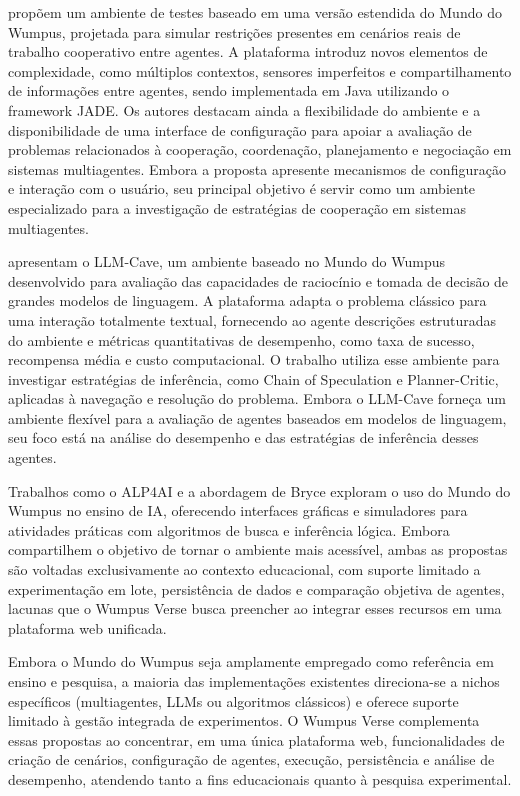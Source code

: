 \cite{salehi2012multicontext} propõem um ambiente de testes baseado em uma versão estendida do Mundo do Wumpus, projetada para simular restrições presentes em cenários reais de trabalho cooperativo entre agentes. A plataforma introduz novos elementos de complexidade, como múltiplos contextos, sensores imperfeitos e compartilhamento de informações entre agentes, sendo implementada em Java utilizando o framework JADE. Os autores destacam ainda a flexibilidade do ambiente e a disponibilidade de uma interface de configuração para apoiar a avaliação de problemas relacionados à cooperação, coordenação, planejamento e negociação em sistemas multiagentes. Embora a proposta apresente mecanismos de configuração e interação com o usuário, seu principal objetivo é servir como um ambiente especializado para a investigação de estratégias de cooperação em sistemas multiagentes.

\cite{li2025llmcave} apresentam o LLM-Cave, um ambiente baseado no Mundo do Wumpus desenvolvido para avaliação das capacidades de raciocínio e tomada de decisão de grandes modelos de linguagem. A plataforma adapta o problema clássico para uma interação totalmente textual, fornecendo ao agente descrições estruturadas do ambiente e métricas quantitativas de desempenho, como taxa de sucesso, recompensa média e custo computacional. O trabalho utiliza esse ambiente para investigar estratégias de inferência, como Chain of Speculation e Planner-Critic, aplicadas à navegação e resolução do problema. Embora o LLM-Cave forneça um ambiente flexível para a avaliação de agentes baseados em modelos de linguagem, seu foco está na análise do desempenho e das estratégias de inferência desses agentes.

Trabalhos como o ALP4AI \cite{lasisi2022alp4ai} e a abordagem de Bryce \cite{bryce2011wumpus} exploram o uso do Mundo do Wumpus no ensino de IA, oferecendo interfaces gráficas e simuladores para atividades práticas com algoritmos de busca e inferência lógica. Embora compartilhem o objetivo de tornar o ambiente mais acessível, ambas as propostas são voltadas exclusivamente ao contexto educacional, com suporte limitado a experimentação em lote, persistência de dados e comparação objetiva de agentes, lacunas que o Wumpus Verse busca preencher ao integrar esses recursos em uma plataforma web unificada.

Embora o Mundo do Wumpus seja amplamente empregado como referência em ensino e pesquisa, a maioria das implementações existentes direciona-se a nichos específicos (multiagentes, LLMs ou algoritmos clássicos) e oferece suporte limitado à gestão integrada de experimentos. O Wumpus Verse complementa essas propostas ao concentrar, em uma única plataforma web, funcionalidades de criação de cenários, configuração de agentes, execução, persistência e análise de desempenho, atendendo tanto a fins educacionais quanto à pesquisa experimental.
 
